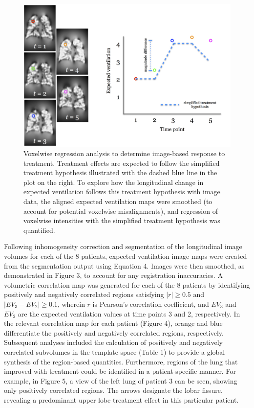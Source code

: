 \documentclass[11pt,]{article}
\begin{document}
\begin{figure}[htbp]
\centering
\includegraphics{Figures/correlation.png}
\caption{Voxelwise regression analysis to determine image-based response
to treatment. Treatment effects are expected to follow the simplified
treatment hypothesis illustrated with the dashed blue line in the plot
on the right. To explore how the longitudinal change in expected
ventilation follows this treatment hypothesis with image data, the
aligned expected ventilation maps were smoothed (to account for
potential voxelwise misalignments), and regression of voxelwise
intensities with the simplified treatment hypothesis was quantified.}
\end{figure}

Following inhomogeneity correction and segmentation of the longitudinal
image volumes for each of the 8 patients, expected ventilation image
maps were created from the segmentation output using Equation 4. Images
were then smoothed, as demonstrated in Figure 3, to account for any
registration inaccuracies. A volumetric correlation map was generated
for each of the 8 patients by identifying positively and negatively
correlated regions satisfying \(|r| \geq 0.5\) and
\(|EV_{3} - EV_{2}| \geq 0.1\), wherein \(r\) is Pearson's correlation
coefficient, and \(EV_{3}\) and \(EV_{2}\) are the expected ventilation
values at time points 3 and 2, respectively. In the relevant correlation
map for each patient (Figure 4), orange and blue differentiate the
positively and negatively correlated regions, respectively. Subsequent
analyses included the calculation of positively and negatively
correlated subvolumes in the template space (Table 1) to provide a
global synthesis of the region-based quantities. Furthermore, regions of
the lung that improved with treatment could be identified in a
patient-specific manner. For example, in Figure 5, a view of the left
lung of patient 3 can be seen, showing only positively correlated
regions. The arrows designate the lobar fissure, revealing a predominant
upper lobe treatment effect in this particular patient.
\end{document}

